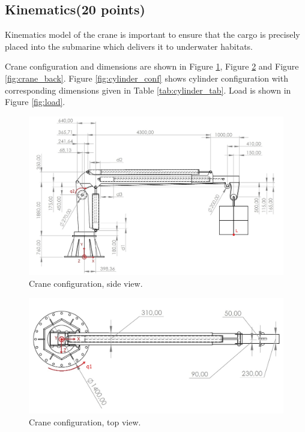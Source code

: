 \documentclass{article}
\begin{document}
	\subsection{Kinematics(20 points)}

	Kinematics model of the crane is important to ensure that the cargo is 
	precisely placed into the submarine which delivers it to underwater 
	habitats.
	
	Crane configuration and dimensions are shown in Figure \ref{fig:crane_side}, Figure \ref{fig:crane_top} and Figure \ref{fig:crane_back}. Figure \ref{fig:cylinder_conf} shows cylinder configuration with corresponding dimensions given in Table \ref{tab:cylinder_tab}. Load is shown in Figure \ref{fig:load}.
	
	\begin{figure}[h!]
		\centering
		\includegraphics[width=\textwidth]{kran_bokocrt.jpg}
		\caption{Crane configuration, side view.}
		\label{fig:crane_side}
	\end{figure}
	
	\begin{figure}[h!]
		\centering
		\includegraphics[width=\textwidth]{kran_tlocrt.jpg}
		\caption{Crane configuration, top view.}
		\label{fig:crane_top}
	\end{figure}
	
\end{document}
